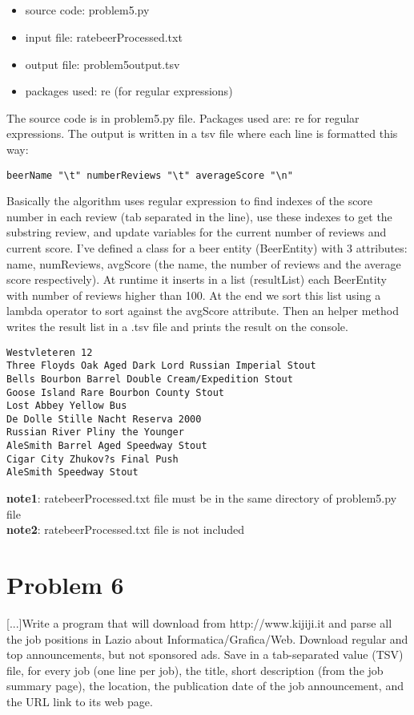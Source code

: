 \documentclass{article}
\begin{document}
\subsection{}
\begin{itemize}
	\item source code: problem5.py
	\item input file: ratebeerProcessed.txt
	\item output file: problem5output.tsv
	\item packages used: re (for regular expressions)
\end{itemize}


The source code is in problem5.py file. Packages used are: re for regular expressions. The output is written in a tsv file where each line is formatted this way: 
\begin{lstlisting} 
beerName "\t" numberReviews "\t" averageScore "\n"
\end{lstlisting}
Basically the algorithm uses regular expression to find indexes of the score number in each review (tab separated in the line), use these indexes to get the substring review, and update variables for the current number of reviews and current score. I've defined a class for a beer entity (BeerEntity) with 3 attributes: name, numReviews, avgScore (the name, the number of reviews and the average score respectively). At runtime it inserts in a list (resultList) each BeerEntity with number of reviews higher than 100. At the end we sort this list using a lambda operator to sort against the avgScore attribute. Then an helper method writes the result list in a .tsv file and prints the result on the console.

\begin{lstlisting} 
Westvleteren 12
Three Floyds Oak Aged Dark Lord Russian Imperial Stout
Bells Bourbon Barrel Double Cream/Expedition Stout
Goose Island Rare Bourbon County Stout
Lost Abbey Yellow Bus 
De Dolle Stille Nacht Reserva 2000
Russian River Pliny the Younger
AleSmith Barrel Aged Speedway Stout
Cigar City Zhukov?s Final Push
AleSmith Speedway Stout
\end{lstlisting}

\textbf{note1}: ratebeerProcessed.txt file must be in the same directory of problem5.py file \\
\textbf{note2}: ratebeerProcessed.txt file is not included


\section{Problem 6}
[...]Write a program that will download from http://www.kijiji.it and parse all the job positions in Lazio about Informatica/Grafica/Web. Download regular and top announcements, but not sponsored ads. Save in a tab-separated value (TSV) file, for every job (one line per job), the title, short description (from the job summary page), the location, the publication date of the job announcement, and the URL link to its web page.
\end{document}
